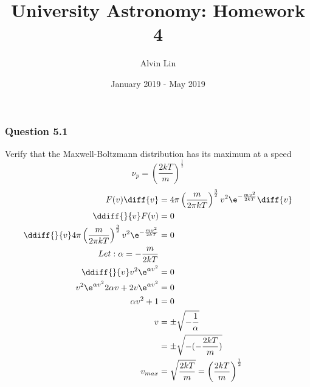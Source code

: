 \documentclass{math}
\title{University Astronomy: Homework 4}
\author{Alvin Lin}
\date{January 2019 - May 2019}
\begin{document}
\maketitle

\subsubsection*{Question 5.1}
Verify that the Maxwell-Boltzmann distribution has its maximum at a speed
\[ \nu_p = \left(\frac{2kT}{m}\right)^{\frac{1}{2}} \]
\begin{align*}
  F(v)\diff{v} &= 4\pi\left(\frac{m}{2\pi kT}\right)^{\frac{3}{2}}v^2
    \e^{-\frac{mv^2}{2kT}}\diff{v} \\
  \ddiff{}{v}F(v) &= 0 \\
  \ddiff{}{v}4\pi\left(\frac{m}{2\pi kT}\right)^{\frac{3}{2}}v^2
    \e^{-\frac{mv^2}{2kT}} &= 0 \\
  Let: \alpha = -\frac{m}{2kT} \\
  \ddiff{}{v}v^2\e^{\alpha v^2} &= 0 \\
  v^2\e^{\alpha v^2}2\alpha v +2v\e^{\alpha v^2} &= 0 \\
  \alpha v^2+1 &= 0 \\
  v &= \pm\sqrt{-\frac{1}{\alpha}} \\
  &= \pm\sqrt{-(-\frac{2kT}{m})} \\
  v_{max} &= \sqrt{\frac{2kT}{m}} = \left(\frac{2kT}{m}\right)^{\frac{1}{2}}
\end{align*}
\end{document}
